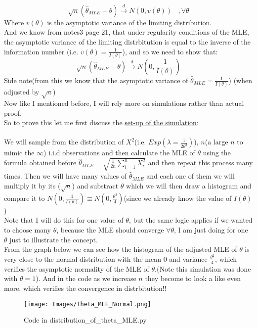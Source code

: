 \documentclass[12pt]{article}
\begin{document}
\[
\sqrt{n}(\hat{\theta}_{MLE} - \theta) \xrightarrow{d} N(0, v(\theta)) \ \ \ \ , \forall \theta
\]
Where $v(\theta)$ is the asymptotic variance of the limiting distribution.\\
And we know from notes3 page 21, that under regularity conditions of the MLE, the asymptotic variance of the limiting distrbitution is equal to the inverse of the information number  (i.e. $v(\theta) =\frac{1}{I(\theta)} $), and so we need to show that: 
\[
\sqrt{n}(\hat{\theta}_{MLE} - \theta) \xrightarrow{d} N(0, \frac{1}{I(\theta)})
\]
Side note(from this we know that the asymptotic variance of $\hat{\theta}_{MLE} = \frac{1}{I(\theta)}$) (when adjusted by $\sqrt{n}$)\\ 
Now like I mentioned before, I will rely more on simulations rather than actual proof.\\
So to prove this let me first discuss the \underline{set-up of the simulation}: \\ \\
We will sample from the distribution of $X^2$(i.e. $Exp(\lambda = \frac{1}{2\theta^2})$), $n$(a large $n$ to mimic the $\infty$) i.i.d observations and then calculate the MLE of $\theta$ using the formula obtained before $\hat{\theta}_{MLE} = \sqrt{\frac{1}{2n}\sum_{i=1}^{n}X_i^2}$ and then repeat this process many times. Then we will have many values of $\hat{\theta}_{MLE}$ and each one of them we will multiply it by its ($\sqrt{n}$) and substract $\theta$ which we will then draw a histogram and compare it to $N(0,\frac{1}{I(\theta)}) \equiv N(0,\frac{\theta^2}{4})$(since we already know the value of $I(\theta)$) \\
Note that I will do this for one value of $\theta$, but the same logic applies if we wanted to choose many $\theta$, because the MLE should converge $\forall \theta$, I am just doing for one $\theta$ just to illustrate the concept.\\
From the graph below we can see how the histogram of the adjusted MLE of $\theta$ is very close to the normal distribution with the mean $0$ and variance $\frac{\theta^2}{4}$, which verifies the asymptotic normality of the MLE of $\theta$.(Note this simulation was done with $\theta=1$). And in the code as we increase $n$ they become to look a like even more, which verifies the convergence in distrbitution!!\\
\begin{figure}[H]
  \centering
  \texttt{[image: Images/Theta\_MLE\_Normal.png]}
  \caption{Code in distribution\_of\_theta\_MLE.py}
\end{figure}
\end{document}
